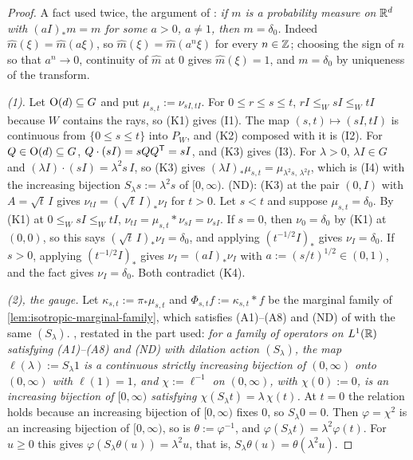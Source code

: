 \begin{proof}
\leanok
A fact used twice, the argument of : \emph{if $m$ is a probability measure on
$\mathbb{R}^d$ with $(aI)_*m = m$ for some $a > 0$, $a \ne 1$, then $m = \delta_0$.} Indeed
$\widehat m(\xi) = \widehat m(a\xi)$, so $\widehat m(\xi) = \widehat m(a^n\xi)$ for every
$n \in \mathbb{Z}$; choosing the sign of $n$ so that $a^n \to 0$, continuity of $\widehat m$ at $0$ gives
$\widehat m(\xi) = 1$, and $m = \delta_0$ by uniqueness of the transform.

\emph{(1).} Let $\mathrm{O}(d) \subseteq G$ and put $\mu_{s,t} := \nu_{sI,tI}$. For $0 \le r \le s \le t$,
$rI \le_W sI \le_W tI$ because $W$ contains the rays, so (K1) gives (I1). The map
$(s,t) \mapsto (sI,tI)$ is continuous from $\{0 \le s \le t\}$ into $P_W$, and (K2) composed with it
is (I2). For $Q \in \mathrm{O}(d) \subseteq G$, $Q \cdot (sI) = sQQ^{\mathsf{T}} = sI$, and (K3) gives (I3). For
$\lambda > 0$, $\lambda I \in G$ and $(\lambda I) \cdot (sI) = \lambda^2 s\,I$, so (K3) gives
$(\lambda I)_*\mu_{s,t} = \mu_{\lambda^2 s,\,\lambda^2 t}$, which is (I4) with the increasing
bijection $S_\lambda s := \lambda^2 s$ of $[0,\infty)$. (ND): (K3) at the pair $(0, I)$ with
$A = \sqrt t\,I$ gives $\nu_{tI} = (\sqrt t\,I)_*\nu_I$ for $t > 0$. Let $s < t$ and suppose
$\mu_{s,t} = \delta_0$. By (K1) at $0 \le_W sI \le_W tI$, $\nu_{tI} = \mu_{s,t} * \nu_{sI} = \nu_{sI}$.
If $s = 0$, then $\nu_{0} = \delta_0$ by (K1) at $(0, 0)$, so this says $(\sqrt t\,I)_*\nu_I = \delta_0$, and applying $(t^{-1/2}I)_*$ gives
$\nu_I = \delta_0$. If $s > 0$, applying $(t^{-1/2}I)_*$ gives $\nu_I = (aI)_*\nu_I$ with
$a := (s/t)^{1/2} \in (0,1)$, and the fact gives $\nu_I = \delta_0$. Both contradict (K4).

\emph{(2), the gauge.} Let $\kappa_{s,t} := \pi_*\mu_{s,t}$ and $\Phi_{s,t}f := \kappa_{s,t} * f$ be
the marginal family of \ref{lem:isotropic-marginal-family}, which satisfies (A1)--(A8) and (ND) of
 with the same $(S_\lambda)$. , restated in the part used: \emph{for a
family of operators on $L^1(\mathbb{R})$ satisfying (A1)--(A8) and (ND) with dilation action
$(S_\lambda)$, the map $\ell(\lambda) := S_\lambda 1$ is a continuous strictly increasing bijection of
$(0,\infty)$ onto $(0,\infty)$ with $\ell(1) = 1$, and $\chi := \ell^{-1}$ on $(0,\infty)$, with
$\chi(0) := 0$, is an increasing bijection of $[0,\infty)$ satisfying
$\chi(S_\lambda t) = \lambda\,\chi(t)$.} At $t = 0$ the relation holds because an increasing
bijection of $[0,\infty)$ fixes $0$, so $S_\lambda 0 = 0$. Then $\varphi = \chi^2$ is an increasing
bijection of $[0,\infty)$, so is $\theta := \varphi^{-1}$, and
$\varphi(S_\lambda t) = \lambda^2\varphi(t)$. For $u \ge 0$ this gives
$\varphi(S_\lambda\theta(u)) = \lambda^2 u$, that is, $S_\lambda\theta(u) = \theta(\lambda^2 u)$.


\end{proof}
